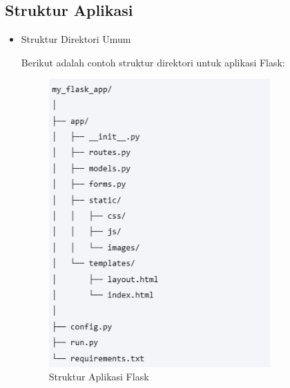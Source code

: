 \documentclass{article}
\begin{document}
\subsection{Struktur Aplikasi}
\begin{itemize}
    \item Struktur Direktori Umum

          Berikut adalah contoh struktur direktori untuk aplikasi Flask:
          \begin{figure}[H]
              \centering
              \includegraphics[width=0.8\textwidth]{flask_dir.png}
              \caption{Struktur Aplikasi Flask}
          \end{figure}


\end{itemize}
\end{document}
